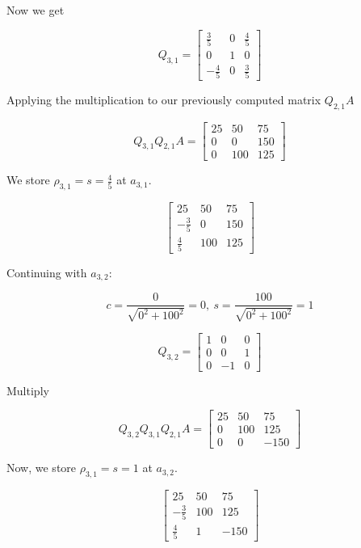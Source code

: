 Now we get 

\[
    Q_{3,1} = 
    \begin{bmatrix}
        \frac{3}{5} & 0 & \frac{4}{5} \\
        0 & 1 & 0 \\
        -\frac{4}{5} & 0 & \frac{3}{5}
    \end{bmatrix}
\]

Applying the multiplication to our previously computed matrix \(Q_{2,1}A\)

\[
    Q_{3,1}Q_{2,1}A = 
    \begin{bmatrix}
        25 & 50 & 75 \\ 
        0 & 0 & 150 \\ 
        0 & 100 & 125
    \end{bmatrix}
\]

We store \(\rho_{3,1} = s = \frac{4}{5}\) at \(a_{3,1}\). 

\[
    \begin{bmatrix}
        25 & 50 & 75 \\ 
        -\frac{3}{5} & 0 & 150 \\ 
        \frac{4}{5} & 100 & 125
    \end{bmatrix}
\]

Continuing with \(a_{3, 2}\):

\[
    c = \frac{0}{\sqrt{0^2 + 100^2}} = 0, \ 
    s = \frac{100}{\sqrt{0^2 + 100^2}} = 1 
\]

\[
    Q_{3,2} = 
    \begin{bmatrix}
        1 & 0 & 0 \\
        0 & 0 & 1 \\
        0 & -1 & 0
    \end{bmatrix}
\]

Multiply 

\[
    Q_{3,2}Q_{3,1}Q_{2,1}A =
    \begin{bmatrix}
        25 & 50 & 75 \\ 
        0 & 100 & 125 \\ 
        0 & 0 & -150
    \end{bmatrix}
\]

Now, we store \(\rho_{3,1} = s = 1\) at \(a_{3,2}\).

\[
    \begin{bmatrix}
        25 & 50 & 75 \\ 
        -\frac{3}{5} & 100 & 125 \\ 
        \frac{4}{5} & 1 & -150
    \end{bmatrix}
\]

